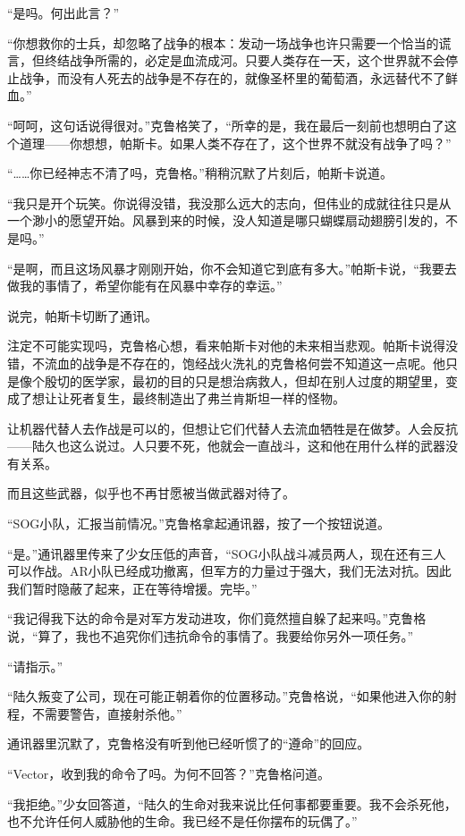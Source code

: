 “是吗。何出此言？”

“你想救你的士兵，却忽略了战争的根本：发动一场战争也许只需要一个恰当的谎言，但终结战争所需的，必定是血流成河。只要人类存在一天，这个世界就不会停止战争，而没有人死去的战争是不存在的，就像圣杯里的葡萄酒，永远替代不了鲜血。”

“呵呵，这句话说得很对。”克鲁格笑了，“所幸的是，我在最后一刻前也想明白了这个道理——你想想，帕斯卡。如果人类不存在了，这个世界不就没有战争了吗？”

“……你已经神志不清了吗，克鲁格。”稍稍沉默了片刻后，帕斯卡说道。

“我只是开个玩笑。你说得没错，我没那么远大的志向，但伟业的成就往往只是从一个渺小的愿望开始。风暴到来的时候，没人知道是哪只蝴蝶扇动翅膀引发的，不是吗。”

“是啊，而且这场风暴才刚刚开始，你不会知道它到底有多大。”帕斯卡说，“我要去做我的事情了，希望你能有在风暴中幸存的幸运。”

说完，帕斯卡切断了通讯。

注定不可能实现吗，克鲁格心想，看来帕斯卡对他的未来相当悲观。帕斯卡说得没错，不流血的战争是不存在的，饱经战火洗礼的克鲁格何尝不知道这一点呢。他只是像个殷切的医学家，最初的目的只是想治病救人，但却在别人过度的期望里，变成了想让让死者复生，最终制造出了弗兰肯斯坦一样的怪物。

让机器代替人去作战是可以的，但想让它们代替人去流血牺牲是在做梦。人会反抗——陆久也这么说过。人只要不死，他就会一直战斗，这和他在用什么样的武器没有关系。

而且这些武器，似乎也不再甘愿被当做武器对待了。

“SOG小队，汇报当前情况。”克鲁格拿起通讯器，按了一个按钮说道。

“是。”通讯器里传来了少女压低的声音，“SOG小队战斗减员两人，现在还有三人可以作战。AR小队已经成功撤离，但军方的力量过于强大，我们无法对抗。因此我们暂时隐蔽了起来，正在等待增援。完毕。”

“我记得我下达的命令是对军方发动进攻，你们竟然擅自躲了起来吗。”克鲁格说，“算了，我也不追究你们违抗命令的事情了。我要给你另外一项任务。”

“请指示。”

“陆久叛变了公司，现在可能正朝着你的位置移动。”克鲁格说，“如果他进入你的射程，不需要警告，直接射杀他。”

通讯器里沉默了，克鲁格没有听到他已经听惯了的“遵命”的回应。

“Vector，收到我的命令了吗。为何不回答？”克鲁格问道。

“我拒绝。”少女回答道，“陆久的生命对我来说比任何事都要重要。我不会杀死他，也不允许任何人威胁他的生命。我已经不是任你摆布的玩偶了。”

